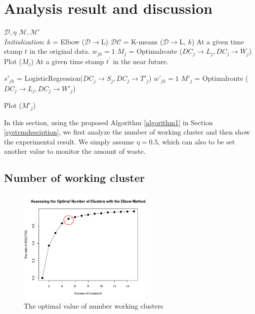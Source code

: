 \documentclass[conference]{IEEEtran}
\begin{document}
\section{Analysis result and discussion}
\begin{algorithm}[]
	\caption{}
	\begin{algorithmic}[1]
		\renewcommand{\algorithmicrequire}{\textbf{Input:}}
		\renewcommand{\algorithmicensure}{\textbf{Output:}}
		\REQUIRE $\mathcal{D}, \eta$
		\ENSURE  $\mathcal{M}, \mathcal{M'}$
		\\ \textit{Initialization}: 
		\STATE $k$ = Elbow ($\mathcal{D}\rightarrow$L)
		\STATE $\mathcal{DC}$ = K-means ($\mathcal{D}\rightarrow$L, $k$)
		\STATE At a given time stamp $t$ in the original data.
		\STATE $w_{jh} = 1$
		\STATE $M_j$ = Optimalroute ($DC_j \rightarrow L_j, DC_j \rightarrow W_j$)
		\ENDIF
		\ENDFOR
		\STATE Plot ($M_j$)
		\ENDFOR
		\STATE At a given time stamp $t^{'}$ in the near future.
		
		\STATE $s'_{jh}$ = LogisticRegression($DC_j \rightarrow S_j, DC_j \rightarrow T'_j$)
		\STATE $w'_{jh} = 1$
		\STATE $M'_j$ = Optimalroute ($DC_j \rightarrow L_j, DC_j \rightarrow W'_j$)
		\ENDIF
		
		\ENDFOR
		\STATE Plot ($M'_j$)
		\ENDFOR
		
	\end{algorithmic} 
	\label{algorithm1}
\end{algorithm}

In this section, using the proposed Algorithm \ref{algorithm1} in Section \ref{systemdesciption}, we first analyze the number of working cluster and then show the experimental result. We simply assume $\eta = 0.5$, which can also to be set another value to monitor the amount of waste. 

\subsection{Number of working cluster}

\begin{figure}
	\centering
	\includegraphics[width=6.5cm]{elbow5}
	\caption{The optimal value of number working clusters}
	\label{fig3}
\end{figure}
\end{document}
